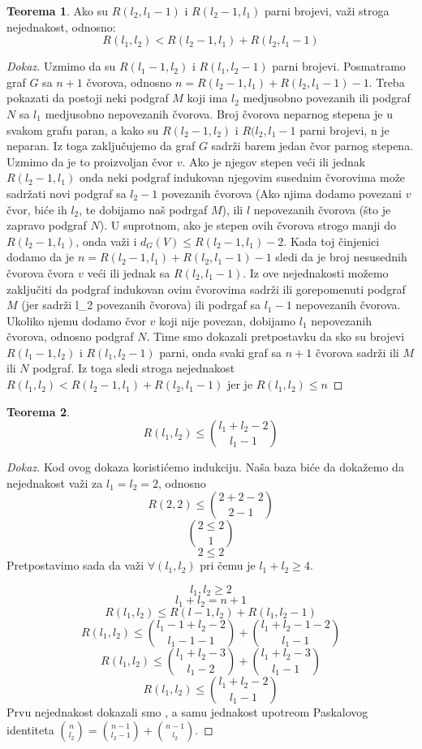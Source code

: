 \documentclass{article}
\theoremstyle{definition}
\newtheorem{teorema}{Teorema}[section]
\newcommand{\dokaz}[1]{\begin{proof}[Dokaz]#1\end{proof}}
\begin{document}
	\begin{teorema}
	Ako su $R(l_2, l_1-1)$ i $R(l_2-1, l_1)$ parni brojevi, važi stroga nejednakost, odnosno: 
	\[
	R(l_1,l_2) < R(l_2-1, l_1) + R(l_2, l_1-1)
	\]
	\end{teorema}
	\dokaz{
	Uzmimo da su $R(l_1-1, l_2)$ i $R(l_1, l_2-1)$ parni brojevi. Posmatramo graf $G$ sa $n+1$ čvorova, odnosno $n=R(l_2-1, l_1)+ R(l_2, l_1-1)-1$.
	Treba pokazati da postoji neki podgraf $M$ koji ima $l_2$ medjusobno povezanih ili podgraf $N$ sa $l_1$ medjusobno nepovezanih čvorova. Broj čvorova neparnog stepena je u svakom grafu paran, a kako su $R(l_2-1, l_2)$ i $R(l_2, l_1-1$ parni brojevi, n je neparan. Iz toga zaključujemo da graf $G$ sadrži barem jedan čvor parnog stepena. Uzmimo da je to proizvoljan čvor $v$. Ako je njegov stepen veći ili jednak $R(l_2-1,l_1)$ onda neki podgraf indukovan njegovim susednim čvorovima može sadržati novi podgraf sa $l_2-1$ povezanih čvorova (Ako njima dodamo povezani $v$ čvor, biće ih $l_2$, te dobijamo naš podrgaf $M$), ili $l$ nepovezanih čvorova (što je zapravo podgraf $N$). 
	\newline
	U suprotnom, ako je stepen ovih čvorova strogo manji do $R(l_2-1,l_1)$, onda važi i $d_G(V) \leq R(l_2-1, l_1)-2$. Kada toj činjenici dodamo da je $n=R(l_2-1, l_1)+ R(l_2, l_1-1)-1$ sledi da je broj nesusednih čvorova čvora $v$ veći ili jednak sa $R(l_2, l_1-1)$. Iz ove nejednakosti možemo zaključiti da podgraf indukovan ovim čvorovima sadrži ili gorepomenuti podgraf $M$ (jer sadrži l_2 povezanih čvorova) ili podrgaf sa $l_1-1$ nepovezanih čvorova. Ukoliko njemu dodamo čvor $v$ koji nije povezan, dobijamo $l_1$ nepovezanih čvorova, odnosno podgraf $N$.
	\newline
	Time smo dokazali pretpostavku da sko su brojevi $R(l_1-1, l_2)$ i $R(l_1, l_2-1)$ parni, onda svaki graf sa $n+1$ čvorova sadrži ili $M$ ili $N$ podgraf. Iz toga sledi stroga nejednakost $R(l_1,l_2) < R(l_2-1, l_1) + R(l_2, l_1-1)$ jer je $R(l_1,l_2) \leq n$ 
	
	}
	


		\begin{teorema}
	\[R(l_1,l_2) \leq {l_1+l_2-2\choose l_1-1} 
	\]
	\end{teorema}
	\dokaz{
	Kod ovog dokaza koristićemo indukciju. Naša baza biće da dokažemo da nejednakost važi za $l_1=l_2=2$, odnosno
	\[ R(2,2) \leq {2+2-2 \choose 2-1}
	\]
	\[
	2 \leq 2 \choose 1
	\]
	\[
	2 \leq 2
	\]
	Pretpostavimo sada da važi $\forall(l_1,l_2)$  pri čemu je $l_1+l_2 \geq 4$.

	\[l_1,l_2 \geq 2
	\]
	\[
	l_1+l_2=n+1
	\]
	\[
	R(l_1,l_2) \leq R(l-1, l_2) + R(l_1, l_2-1)
	\]
	\[
	R(l_1,l_2) \leq {{l_1-1+l_2-2 \choose l_1-1-1} + {l_1+l_2-1-2 \choose l_1-1}}
	\]
	\[
	R(l_1,l_2) \leq {{l_1+l_2-3 \choose l_1-2} + {l_1+l_2-3 \choose l_1-1}}
	\]
	\[
	R(l_1,l_2) \leq {l_1+l_2-2 \choose l_1-1}
	\]
	Prvu nejednakost dokazali smo %
	, a samu jednakost upotreom Paskalovog identiteta ${n \choose l_2} = {n-1 \choose l_2-1} + {n-1 \choose l_2}$.
}
	
\end{document}
